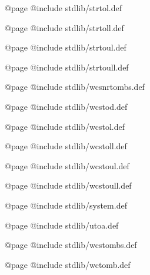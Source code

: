 @page
@include stdlib/strtol.def

@page
@include stdlib/strtoll.def

@page
@include stdlib/strtoul.def

@page
@include stdlib/strtoull.def

@page
@include stdlib/wcsnrtombs.def

@page
@include stdlib/wcstod.def

@page
@include stdlib/wcstol.def

@page
@include stdlib/wcstoll.def

@page
@include stdlib/wcstoul.def

@page
@include stdlib/wcstoull.def

@page
@include stdlib/system.def

@page
@include stdlib/utoa.def

@page
@include stdlib/wcstombs.def

@page
@include stdlib/wctomb.def

